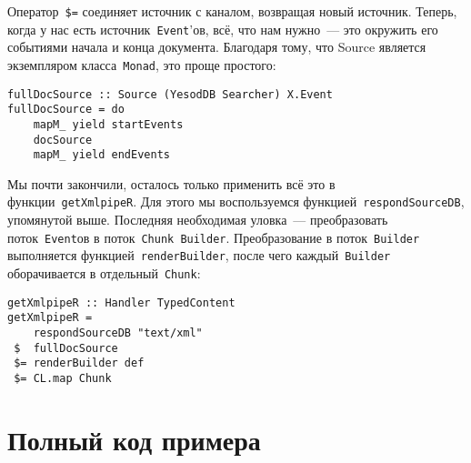 Оператор~\lstinline'$=' соединяет источник с каналом, возвращая новый источник. Теперь, когда у нас есть источник~\lstinline!Event!'ов, всё, что нам нужно~--- это окружить его событиями начала и конца документа. Благодаря тому, что Source является экземпляром класса~\lstinline!Monad!, это проще простого:
\begin{lstlisting}
fullDocSource :: Source (YesodDB Searcher) X.Event
fullDocSource = do
    mapM_ yield startEvents
    docSource
    mapM_ yield endEvents
\end{lstlisting}

Мы почти закончили, осталось только применить всё это в функции~\lstinline!getXmlpipeR!. Для этого мы воспользуемся функцией~\lstinline'respondSourceDB', упомянутой выше. Последняя необходимая уловка~--- преобразовать поток~\lstinline'Event'ов в поток~\lstinline'Chunk Builder'. Преобразование в поток~\lstinline'Builder' выполняется функцией~\lstinline'renderBuilder', после чего каждый~\lstinline'Builder' оборачивается в отдельный~\lstinline'Chunk':
\begin{lstlisting}
getXmlpipeR :: Handler TypedContent
getXmlpipeR =
    respondSourceDB "text/xml"
 $  fullDocSource
 $= renderBuilder def
 $= CL.map Chunk
\end{lstlisting}

\section{Полный код примера}

